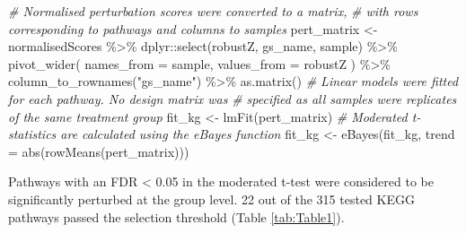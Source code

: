 \documentclass[9pt,a4paper,]{extarticle}
\newenvironment{Shaded}{\begin{snugshade}}{\end{snugshade}}
\newcommand{\AttributeTok}[1]{\textcolor[rgb]{0.77,0.63,0.00}{#1}}
\newcommand{\CommentTok}[1]{\textcolor[rgb]{0.56,0.35,0.01}{\textit{#1}}}
\newcommand{\FunctionTok}[1]{\textcolor[rgb]{0.00,0.00,0.00}{#1}}
\newcommand{\NormalTok}[1]{#1}
\newcommand{\OtherTok}[1]{\textcolor[rgb]{0.56,0.35,0.01}{#1}}
\newcommand{\SpecialCharTok}[1]{\textcolor[rgb]{0.00,0.00,0.00}{#1}}
\newcommand{\StringTok}[1]{\textcolor[rgb]{0.31,0.60,0.02}{#1}}
\begin{document}
\begin{Shaded}
\begin{Highlighting}[]
\CommentTok{\# Normalised perturbation scores were converted to a matrix, }
\CommentTok{\# with rows corresponding to pathways and columns to samples }
\NormalTok{pert\_matrix }\OtherTok{\textless{}{-}}\NormalTok{ normalisedScores }\SpecialCharTok{\%\textgreater{}\%}
\NormalTok{    dplyr}\SpecialCharTok{::}\FunctionTok{select}\NormalTok{(robustZ, gs\_name, sample) }\SpecialCharTok{\%\textgreater{}\%}
    \FunctionTok{pivot\_wider}\NormalTok{(}
        \AttributeTok{names\_from =}\NormalTok{ sample, }
        \AttributeTok{values\_from =}\NormalTok{ robustZ}
\NormalTok{    ) }\SpecialCharTok{\%\textgreater{}\%}
    \FunctionTok{column\_to\_rownames}\NormalTok{(}\StringTok{"gs\_name"}\NormalTok{) }\SpecialCharTok{\%\textgreater{}\%}
\FunctionTok{as.matrix}\NormalTok{()}
\CommentTok{\# Linear models were fitted for each pathway. No design matrix was }
\CommentTok{\# specified as all samples were replicates of the same treatment group}
\NormalTok{fit\_kg }\OtherTok{\textless{}{-}} \FunctionTok{lmFit}\NormalTok{(pert\_matrix)}
\CommentTok{\# Moderated t{-}statistics are calculated using the eBayes function}
\NormalTok{fit\_kg }\OtherTok{\textless{}{-}} \FunctionTok{eBayes}\NormalTok{(fit\_kg, }\AttributeTok{trend =} \FunctionTok{abs}\NormalTok{(}\FunctionTok{rowMeans}\NormalTok{(pert\_matrix)))}
\end{Highlighting}
\end{Shaded}

Pathways with an FDR \textless{} 0.05 in the moderated t-test were considered to be significantly perturbed at the group level. 22 out of the 315 tested KEGG pathways passed the selection threshold (Table \ref{tab:Table1}).
\end{document}
